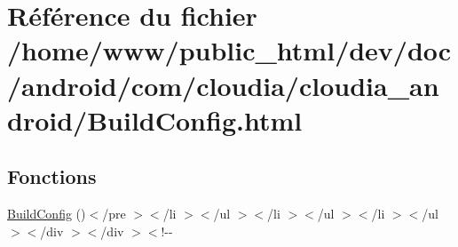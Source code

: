 \hypertarget{_build_config_8html}{\section{Référence du fichier /home/www/public\-\_\-html/dev/doc/android/com/cloudia/cloudia\-\_\-android/\-Build\-Config.html}
\label{_build_config_8html}
}
\subsection*{Fonctions}
\begin{DoxyCompactItemize}
\item 
\hyperlink{_build_config_8html_a3cd80e0fb2dbaea1fa74f7e5e2da5da1}{Build\-Config} ()$<$/pre $>$$<$/li $>$$<$/ul $>$$<$/li $>$$<$/ul $>$$<$/li $>$$<$/ul $>$$<$/div $>$$<$/div $>$$<$!-\/-\/
\end{DoxyCompactItemize}
